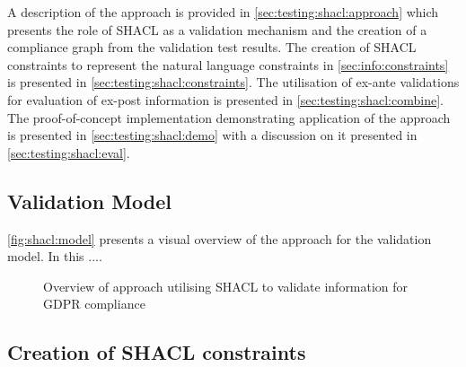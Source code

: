 A description of the approach is provided in \autoref{sec:testing:shacl:approach} which presents the role of SHACL as a validation mechanism and the creation of a compliance graph from the validation test results. The creation of SHACL constraints to represent the natural language constraints in \autoref{sec:info:constraints} is presented in \autoref{sec:testing:shacl:constraints}.
The utilisation of ex-ante validations for evaluation of ex-post information is presented in \autoref{sec:testing:shacl:combine}.
The proof-of-concept implementation demonstrating application of the approach is presented in \autoref{sec:testing:shacl:demo} with a discussion on it presented in \autoref{sec:testing:shacl:eval}.

\subsection{Validation Model}\label{sec:testing:shacl:approach}
\autoref{fig:shacl:model} presents a visual overview of the approach for the validation model.
In this ....
\begin{figure}[htbp]
    \centering
    \caption{Overview of approach utilising SHACL to validate information for GDPR compliance}
    \label{fig:shacl:model}
\end{figure}

\subsection{Creation of SHACL constraints}\label{sec:testing:shacl:constraints}


